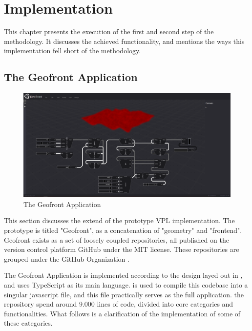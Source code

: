 \chapter{Implementation}%
\label{chap:implementation}
This chapter presents the execution of the first and second step of the methodology. 
It discusses the achieved functionality, and mentions the ways this implementation fell short of the methodology.

\section{The Geofront Application}
\label{sec:implementation:app}

\begin{figure}
  \centering
  \graphicspath{ {../../assets/images/implementation/} }
  \includegraphics[width=\linewidth]{full-application.png}
  \caption[Geofront]{The Geofront Application}
  \label{fig:geofront-app}
\end{figure}

This section discusses the extend of the prototype \ac{VPL} implementation. 
The prototype is titled "Geofront", as a concatenation of "geometry" and "frontend".
Geofront exists as a set of loosely coupled repositories, all published on the version control platform GitHub under the MIT license. These repositories are grouped under the GitHub Organization  .


The Geofront Application is implemented according to the design layed out in , and uses TypeScript as its main language. 
 is used to compile this codebase into a singular javascript file, and this file practically serves as the full application. 
the repository spend around 9.000 lines of code, divided into core categories and functionalities.
What follows is a clarification of the implementation of some of these categories.

